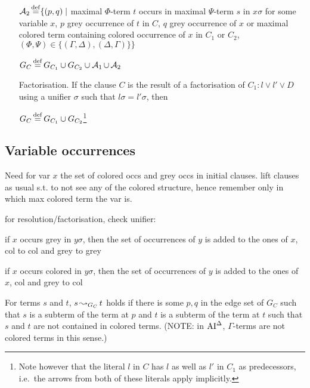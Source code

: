 \documentclass[,%
	draft=false,%
	numbers=noendperiod
	11pt,
	a4paper,
	oneside,%
	openany,
]{memoir}
\begin{document}
\begin{defi}
\begin{itemize}
			$\operatorname{\mathcal{A}}_2 \operatorname{\stackrel{\mathrm{def}}{=}} \{ (p, q) \mid $ maximal $\Phi$-term $t$ occurs in maximal $\Psi$-term $s$ in $x\sigma$ for some variable $x$, $p$ grey occurrence of $t$ in $C$, $q$ grey occurrence of $x$ or maximal colored term containing colored occurrence of $x$ in $C_1$ or $C_2$,
			$(\Phi, \Psi) \in \{(\Gamma, \Delta), (\Delta, \Gamma)\} \} $


			$G_C \operatorname{\stackrel{\mathrm{def}}{=}} G_{C_1} \cup G_{C_2} \cup \operatorname{\mathcal{A}}_1 \cup \operatorname{\mathcal{A}}_2$


		\item[Factorisation.]
			If the clause $C$ is the result of a factorisation of $C_1: l \lor l' \lor D$ using a unifier $\sigma$ such that $l\sigma = l'\sigma$, then

			$G_C \operatorname{\stackrel{\mathrm{def}}{=}} G_{C_1} \cup G_{C_2}$\footnote{Note however that the literal $l$ in $C$ has $l$ as well as $l'$ in $C_1$ as predecessors, i.e.~the arrows from both of these literals apply implicitly.}
			\qedhere
	\end{itemize}
\end{defi}


\cbstart
\subsection{Variable occurrences}
Need for var $x$ the set of colored occs and grey occs in initial clauses.
lift clauses as usual s.t. to not see any of the colored structure, hence remember only in which max colored term the var is.

for resolution/factorisation, check unifier:
\begin{compactitem}
\item
	if $x$ occurs grey in $y\sigma$, then the set of occurrences of $y$ is added to the ones of $x$, col to col and grey to grey
\item
	if $x$ occurs colored in $y\sigma$, then the set of occurrences of $y$ is added to the ones of $x$, col and grey to col
\end{compactitem}
\cbend



\begin{defi}[$\apath$]
	For terms $s$ and $t$, $s\operatorname{\leadsto}_{G_C} t$ holds if there is some $p, q$ in the edge set of $G_C$ such that $s$ is a subterm of the term at $p$ and $t$ is a subterm of the term at $t$ such that $s$ and $t$ are not contained in colored terms. (NOTE: in $\operatorname{AI}^\Delta$, $\Gamma$-terms are not colored terms in this sense.)
\end{defi}
\end{document}
